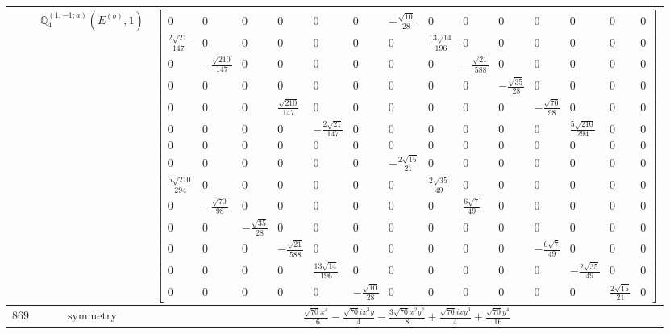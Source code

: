 \documentclass[fleqn,8pt,landscape]{jsarticle}
\begin{document}
\begin{longtable}{ccc}
$  $ & $ \mathbb{Q}_{4}^{(1,-1;a)}(E^{(b)},1) $ & $ \begin{bmatrix} 0 & 0 & 0 & 0 & 0 & 0 & - \frac{\sqrt{10}}{28} & 0 & 0 & 0 & 0 & 0 & 0 & 0 \\ \frac{2 \sqrt{21}}{147} & 0 & 0 & 0 & 0 & 0 & 0 & \frac{13 \sqrt{14}}{196} & 0 & 0 & 0 & 0 & 0 & 0 \\ 0 & - \frac{\sqrt{210}}{147} & 0 & 0 & 0 & 0 & 0 & 0 & - \frac{\sqrt{21}}{588} & 0 & 0 & 0 & 0 & 0 \\ 0 & 0 & 0 & 0 & 0 & 0 & 0 & 0 & 0 & - \frac{\sqrt{35}}{28} & 0 & 0 & 0 & 0 \\ 0 & 0 & 0 & \frac{\sqrt{210}}{147} & 0 & 0 & 0 & 0 & 0 & 0 & - \frac{\sqrt{70}}{98} & 0 & 0 & 0 \\ 0 & 0 & 0 & 0 & - \frac{2 \sqrt{21}}{147} & 0 & 0 & 0 & 0 & 0 & 0 & \frac{5 \sqrt{210}}{294} & 0 & 0 \\ 0 & 0 & 0 & 0 & 0 & 0 & 0 & 0 & 0 & 0 & 0 & 0 & 0 & 0 \\ 0 & 0 & 0 & 0 & 0 & 0 & - \frac{2 \sqrt{15}}{21} & 0 & 0 & 0 & 0 & 0 & 0 & 0 \\ \frac{5 \sqrt{210}}{294} & 0 & 0 & 0 & 0 & 0 & 0 & \frac{2 \sqrt{35}}{49} & 0 & 0 & 0 & 0 & 0 & 0 \\ 0 & - \frac{\sqrt{70}}{98} & 0 & 0 & 0 & 0 & 0 & 0 & \frac{6 \sqrt{7}}{49} & 0 & 0 & 0 & 0 & 0 \\ 0 & 0 & - \frac{\sqrt{35}}{28} & 0 & 0 & 0 & 0 & 0 & 0 & 0 & 0 & 0 & 0 & 0 \\ 0 & 0 & 0 & - \frac{\sqrt{21}}{588} & 0 & 0 & 0 & 0 & 0 & 0 & - \frac{6 \sqrt{7}}{49} & 0 & 0 & 0 \\ 0 & 0 & 0 & 0 & \frac{13 \sqrt{14}}{196} & 0 & 0 & 0 & 0 & 0 & 0 & - \frac{2 \sqrt{35}}{49} & 0 & 0 \\ 0 & 0 & 0 & 0 & 0 & - \frac{\sqrt{10}}{28} & 0 & 0 & 0 & 0 & 0 & 0 & \frac{2 \sqrt{15}}{21} & 0 \end{bmatrix} $ \\ \hline
$ 869 $ & $ \text{symmetry} $ & $ \frac{\sqrt{70} x^{4}}{16} - \frac{\sqrt{70} i x^{3} y}{4} - \frac{3 \sqrt{70} x^{2} y^{2}}{8} + \frac{\sqrt{70} i x y^{3}}{4} + \frac{\sqrt{70} y^{4}}{16} $ \\

\end{longtable}
\end{document}
